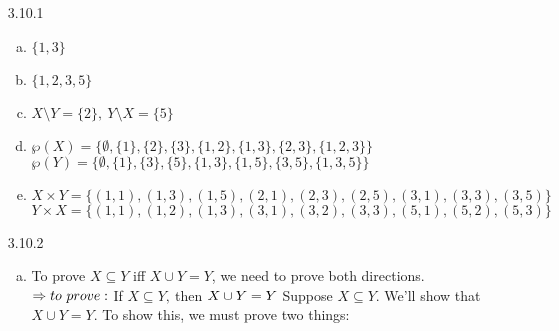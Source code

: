 	\begin{itemize}

	\item[3.10.1]
	
	\begin{enumerate}[(a)]
		    \item $\{1,3\}$
 		   \item $\{1,2,3,5\}$
 		   \item $X\setminus Y = \{2\},\ Y\setminus X = \{5\}$
   		 \item $\wp(X) = \{\emptyset,\{1\},\{2\},\{3\}, \{1,2\},\{1,3\},\{2,3\},\{1,2,3\}\}$\\$\wp(Y)=\{\emptyset,\{1\},\{3\},\{5\}, \{1,3\},\{1,5\},\{3,5\},\{1,3,5\}\} $
   		 \item $X \times Y = \{(1,1),(1,3),(1,5),(2,1),(2,3),(2,5),(3,1),(3,3),(3,5)\}$\\$Y \times X = \{(1,1),(1,2),(1,3),(3,1),(3,2),(3,3),(5,1),(5,2),(5,3)\}$
		\end{enumerate}

      \item[3.10.2]

        \begin{enumerate}[(a)]

          \item To prove $X\subseteq Y$ iff $X\cup Y = Y$, we need to prove both directions.\\$\Rightarrow\\ to\ prove:\\$If $ X\subseteq Y,\ $then $ X\cup Y = Y \\$ Suppose $X \subseteq Y$. We'll show that $X \cup Y = Y$. To show this, we must prove two things:


\end{enumerate}
\end{itemize}
